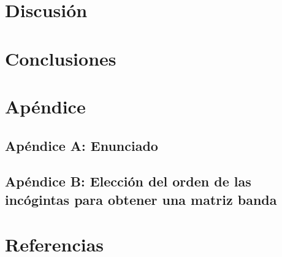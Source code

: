 \documentclass[10pt, a4paper,english,spanish]{article}
\begin{document}
\section{Discusión}

\clearpage

\section{Conclusiones}


\section{Apéndice}
\subsection{Apéndice A: Enunciado}\label{enunciado}
% 
\subsection{Apéndice B: Elección del orden de las incógintas para obtener una matriz banda}\label{banda}
% 

\section{Referencias}
\end{document}
